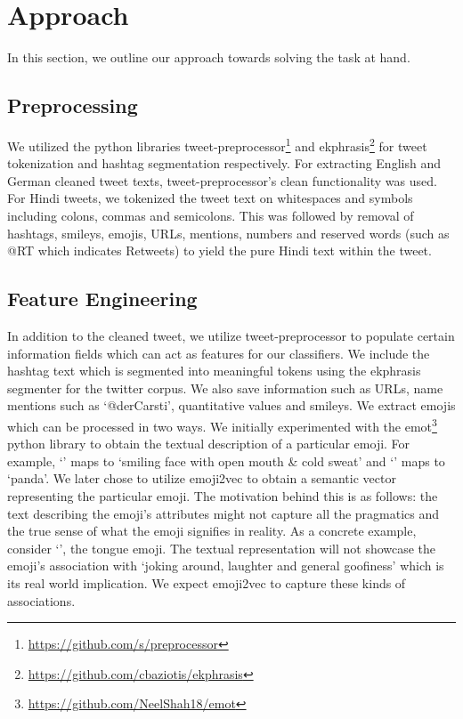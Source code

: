 \documentclass[
]{ceurart}
\begin{document}
\section{Approach}
In this section, we outline our approach towards solving the task at hand.

\subsection{Preprocessing}
We utilized the python libraries tweet-preprocessor\footnote{\url{https://github.com/s/preprocessor}} and ekphrasis\footnote{\url{https://github.com/cbaziotis/ekphrasis}} for tweet tokenization and hashtag segmentation respectively. For extracting English and German cleaned tweet texts, tweet-preprocessor’s clean functionality was used. For Hindi tweets, we tokenized the tweet text on whitespaces and symbols including colons, commas and semicolons. This was followed by removal of hashtags, smileys, emojis, URLs, mentions, numbers and reserved words (such as @RT which indicates Retweets) to yield the pure Hindi text within the tweet.

\subsection{Feature Engineering}
\label{sec:featEng}
In addition to the cleaned tweet, we utilize tweet-preprocessor to populate certain information fields which can act as features for our classifiers. We include the hashtag text which is segmented into meaningful tokens using the ekphrasis segmenter for the twitter corpus. We also save information such as URLs, name mentions such as `@derCarsti’, quantitative values and smileys. We extract emojis which can be processed in two ways. We initially experimented with the emot\footnote{\url{https://github.com/NeelShah18/emot}} python library to obtain the textual description of a particular emoji. For example, `\Large{\emojismilesweat{}{}}\normalsize' maps to `smiling face with open mouth \& cold sweat' and `\Large{\emojipanda{}{}}\normalsize' maps to `panda'. We later chose to utilize emoji2vec\cite{DBLP:journals/corr/EisnerRABR16} to obtain a semantic vector representing the particular emoji. The motivation behind this is as follows: the text describing the emoji’s attributes might not capture all the pragmatics and the true sense of what the emoji signifies in reality. As a concrete example, consider `\Large{\emojitongue{}{}}\normalsize', the tongue emoji. The textual representation will not showcase the emoji’s association with `joking around, laughter and general goofiness’ which is its real world implication. We expect emoji2vec to capture these kinds of associations.
\end{document}
